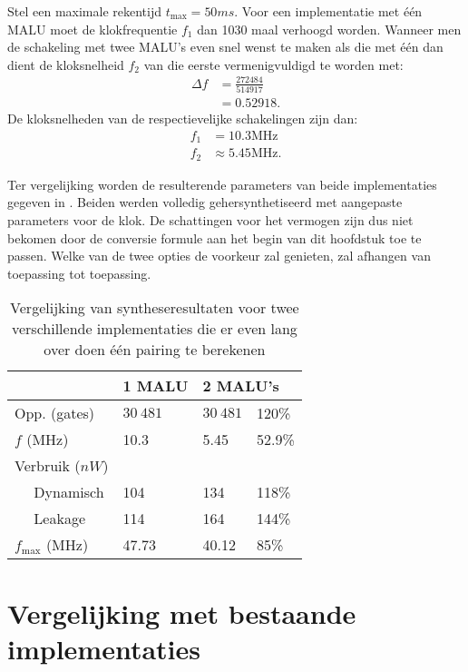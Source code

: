 Stel een maximale rekentijd $t_{\text{max}} = 50ms$. Voor een implementatie met \'e\'en MALU moet de klokfrequentie $f_1$ dan 1030 maal verhoogd worden. Wanneer men de schakeling met twee MALU's even snel wenst te maken als die met \'e\'en dan dient de kloksnelheid $f_2$ van die eerste vermenigvuldigd te worden met:
\[\begin{aligned}
\Delta f &= \frac{272484}{514917}\\
	&= 0.52918.
\end{aligned}\]
De kloksnelheden van de respectievelijke schakelingen zijn dan:
\[\begin{aligned}
f_1	&= 10.3\text{MHz}\\
f_2	&\approx 5.45\text{MHz}.
\end{aligned}\]

Ter vergelijking worden de resulterende parameters van beide implementaties gegeven in . Beiden werden volledig gehersynthetiseerd met aangepaste parameters voor de klok. De schattingen voor het vermogen zijn dus niet bekomen door de conversie formule aan het begin van dit hoofdstuk toe te passen. Welke van de twee opties de voorkeur zal genieten, zal afhangen van toepassing tot toepassing.

\begin{table}[h]
	\caption{Vergelijking van syntheseresultaten voor twee verschillende implementaties die er even lang over doen \'e\'en pairing te berekenen}
	\label{tabel-resultaten-m1-vs-m2}

	\centering
	\begin{tabular}{|l|l|l@{\;\;}l|}
		\hline
		& 1 MALU	& \multicolumn{2}{l|}{2 MALU's}\\
		\hline \hline
		Opp. (gates)	& $30\:481$	& $30\:481$	& 120\% \\ \hline
		$f$ (MHz)		& 10.3		& 5.45		& 52.9\% \\ \hline
		Verbruik ($nW$)& 				& 				& \\
		$\quad$ Dynamisch	& 104			& 134			& 118\% \\
		$\quad$ Leakage	& 114			& 164			& 144\% \\ \hline
		$f_{\text{max}}$ (MHz)	& 47.73	& 40.12	& 85\% \\
		\hline		
	\end{tabular}
\end{table}

\section{Vergelijking met bestaande implementaties}

